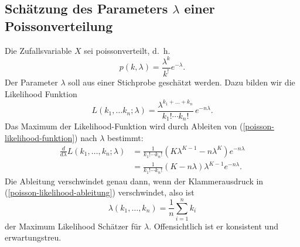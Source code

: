 \subsection{Schätzung des Parameters \texorpdfstring{$\lambda$}{lambda} einer Poissonverteilung}
Die Zufallsvariable $X$ sei poissonverteilt, d.~h.
\begin{equation}
p(k, \lambda)=\frac{\lambda^k}{k^!}e^{-\lambda}.
\end{equation}
Der Parameter $\lambda$ soll aus einer Stichprobe geschätzt werden.
Dazu bilden wir die Likelihood Funktion
\begin{equation}
L(k_1,\dots k_n;\lambda)=\frac{\lambda^{k_1+\dots+k_n}}{k_1!\dotsm k_n!}
\,e^{-n\lambda}.
\label{poisson-likelihood-funktion}
\end{equation}
Das Maximum der Likelihood-Funktion wird durch Ableiten von
(\ref{poisson-likelihood-funktion}) nach $\lambda$
bestimmt:
\begin{align}
\frac{d}{d\lambda}L(k_1,\dots,k_n;\lambda)
&=
\frac{1}{k_1!\dotsm k_n!}(K\lambda^{K-1}-n\lambda^K)e^{-n\lambda}\nonumber
\\
&=
\frac{1}{k_1!\dotsm k_n!}(K-n\lambda)\lambda^{K-1}e^{-n\lambda}.
\label{poisson-likelihood-ableitung}
\end{align}
Die Ableitung verschwindet genau dann, wenn der Klammerausdruck in
(\ref{poisson-likelihood-ableitung}) verschwindet, also ist
\begin{equation}
\lambda(k_1,\dots,k_n) =\frac1n\sum_{i=1}^nk_i
\end{equation}
der Maximum Likelihood Schätzer für $\lambda$.
Offensichtlich ist er
konsistent und erwartungstreu.

